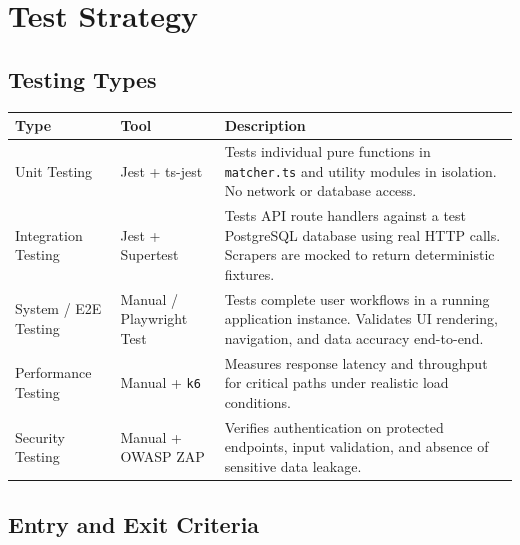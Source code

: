 \documentclass[12pt,a4paper]{report}
\begin{document}
\chapter{Test Strategy}

\section{Testing Types}

\begin{longtable}{L{2.5cm} L{3.5cm} L{7cm}}
  \toprule
  \textbf{Type} & \textbf{Tool} & \textbf{Description} \\
  \midrule
  \endhead
  Unit Testing &
    Jest + ts-jest &
    Tests individual pure functions in \texttt{matcher.ts} and utility
    modules in isolation. No network or database access. \\[3pt]
  Integration Testing &
    Jest + Supertest &
    Tests API route handlers against a test PostgreSQL database using
    real HTTP calls. Scrapers are mocked to return deterministic fixtures. \\[3pt]
  System / E2E Testing &
    Manual / Playwright Test &
    Tests complete user workflows in a running application instance. Validates
    UI rendering, navigation, and data accuracy end-to-end. \\[3pt]
  Performance Testing &
    Manual + \texttt{k6} &
    Measures response latency and throughput for critical paths under
    realistic load conditions. \\[3pt]
  Security Testing &
    Manual + OWASP ZAP &
    Verifies authentication on protected endpoints, input validation,
    and absence of sensitive data leakage. \\
  \bottomrule
\end{longtable}

\section{Entry and Exit Criteria}
\end{document}
